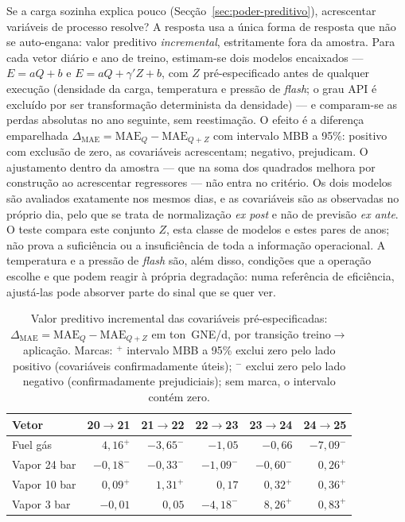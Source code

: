 Se a carga sozinha explica pouco (Secção~\ref{sec:poder-preditivo}), acrescentar
variáveis de processo resolve? A resposta usa a única forma de
resposta que não se auto-engana: valor preditivo \emph{incremental},
estritamente fora da amostra. Para cada vetor diário e ano de treino,
estimam-se dois modelos encaixados --- $E = aQ + b$ e $E = aQ + \gamma'Z + b$,
com $Z$ pré-especificado antes de qualquer execução (densidade da carga,
temperatura e pressão de \emph{flash}; o grau API é excluído por ser
transformação determinista da densidade) --- e comparam-se as perdas absolutas
no ano seguinte, sem reestimação. O efeito é a diferença emparelhada
$\Delta_{\mathrm{MAE}} = \mathrm{MAE}_{Q} - \mathrm{MAE}_{Q+Z}$ com intervalo
MBB a 95\%: positivo com exclusão de zero, as covariáveis acrescentam;
negativo, prejudicam. O ajustamento dentro da amostra --- que na soma dos
quadrados melhora por construção ao acrescentar regressores --- não entra no
critério. Os dois modelos são avaliados exatamente nos mesmos dias, e as
covariáveis são as observadas no próprio dia, pelo que se trata de
normalização \emph{ex post} e não de previsão \emph{ex ante}. O teste
compara este conjunto $Z$, esta classe de modelos e estes pares de anos; não
prova a suficiência ou a insuficiência de toda a informação operacional. A
temperatura e a pressão de \emph{flash} são, além disso, condições que a
operação escolhe e que podem reagir à própria degradação: numa referência de
eficiência, ajustá-las pode absorver parte do sinal que se quer ver.

\begin{table}[htbp]
  \centering
  \caption[Valor incremental das covariáveis]{Valor preditivo
  incremental das covariáveis pré-especificadas:
  $\Delta_{\mathrm{MAE}} = \mathrm{MAE}_{Q} - \mathrm{MAE}_{Q+Z}$ em
  ton~GNE/d, por transição treino${\to}$aplicação. Marcas: $^{+}$ intervalo
  MBB a 95\% exclui zero pelo lado positivo (covariáveis confirmadamente
  úteis); $^{-}$ exclui zero pelo lado negativo (confirmadamente
  prejudiciais); sem marca, o intervalo contém zero.}
  \label{tab:covariaveis-incremental}
  \begin{tabular}{lrrrrr}
    \toprule
    Vetor & \multicolumn{1}{c}{20${\to}$21} & \multicolumn{1}{c}{21${\to}$22}
    & \multicolumn{1}{c}{22${\to}$23} & \multicolumn{1}{c}{23${\to}$24}
    & \multicolumn{1}{c}{24${\to}$25} \\
    \midrule
    Fuel gás     & $4{,}16^{+}$  & $-3{,}65^{-}$ & $-1{,}05$      & $-0{,}66$     & $-7{,}09^{-}$ \\
    Vapor 24 bar & $-0{,}18^{-}$ & $-0{,}33^{-}$ & $-1{,}09^{-}$  & $-0{,}60^{-}$ & $0{,}26^{+}$  \\
    Vapor 10 bar & $0{,}09^{+}$  & $1{,}31^{+}$  & $0{,}17$       & $0{,}32^{+}$  & $0{,}36^{+}$  \\
    Vapor 3 bar  & $-0{,}01$     & $0{,}05$      & $-4{,}18^{-}$  & $8{,}26^{+}$  & $0{,}83^{+}$  \\
    \bottomrule
  \end{tabular}
\end{table}

